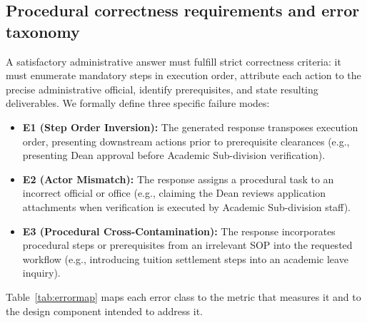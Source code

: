 \documentclass[preprint,10pt]{elsarticle}
\begin{document}
\begin{table}[!htbp]
\centering
\caption{Characteristics of the 7 FSM Universitas Diponegoro SOP documents. ``PDF steps'' denotes numbered steps in official source documents; ``Graph steps'' denotes nodes in the curated workflow graph.}
\label{tab:corpus}
\small
\setlength{\tabcolsep}{4pt}
\end{table}

\subsection{Procedural correctness requirements and error taxonomy}
A satisfactory administrative answer must fulfill strict correctness criteria: it must enumerate mandatory steps in execution order, attribute each action to the precise administrative official, identify prerequisites, and state resulting deliverables. We formally define three specific failure modes:
\begin{itemize}[leftmargin=*]
\item \textbf{E1 (Step Order Inversion):} The generated response transposes execution order, presenting downstream actions prior to prerequisite clearances (e.g., presenting Dean approval before Academic Sub-division verification).
\item \textbf{E2 (Actor Mismatch):} The response assigns a procedural task to an incorrect official or office (e.g., claiming the Dean reviews application attachments when verification is executed by Academic Sub-division staff).
\item \textbf{E3 (Procedural Cross-Contamination):} The response incorporates procedural steps or prerequisites from an irrelevant SOP into the requested workflow (e.g., introducing tuition settlement steps into an academic leave inquiry).
\end{itemize}
Table~\ref{tab:errormap} maps each error class to the metric that measures it and to the design component intended to address it.
\end{document}
